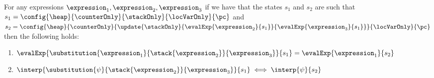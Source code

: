 %         
%      


\begin{substStack}\label{substStack} 
For any expressions $ \expression_1, \expression_2, \expression_3 $ 
if we have that the states $s_1$ and $s_2$ are such that
 $s_1 =   \config{\heap}{\counterOnly}{ \stackOnly }{\locVarOnly}{\pc }$ and 
  $s_2 = \config{\heap}{\counterOnly}{ \update{\stackOnly}
                                                                 {\evalExp{\expression_2}{ s_1 } }
                                                                 { \evalExp{\expression_3}{ s_1  } } }{\locVarOnly}{\pc }$ then
 the following holds:
\begin{enumerate}
      \item  $     \evalExp{\substitution{\expression_1}{\stack{\expression_2}}{\expression_3}}{s_1 } = 
      \evalExp{\expression_1}{s_2 }$
      \item  $     \interp{\substitution{\psi}{\stack{\expression_2}}{\expression_3}}{s_1 } \iff
      \interp{\psi}{s_2 }$
\end{enumerate}
\end{substStack}


